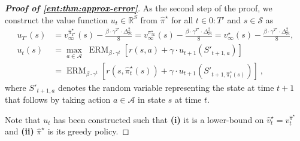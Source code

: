 \documentclass[twoside]{article}
\newcommand{\states}{\mathcal{S}}
\newcommand{\actions}{\mathcal{A}}
\newcommand{\opt}{^\star}
\newcommand{\vspan}{\Delta_{\mathfrak{R}}}
\newcommand{\erm}[2]{\operatorname{ERM}_{#1}\left[#2\right]}
\newcommand{\Real}{\mathbb{R}}
\theoremstyle{plain}
\theoremstyle{definition}
\theoremstyle{remark}
\begin{document}
\begin{proof}[\bf\em Proof of \cref{ent:thm:approx-error}]
As the second step of the proof, we construct the value function $u_t\in \Real^S$ from $\hat{\pi}\opt$ for all $t \in 0{:}T'$ and $s\in \states$ as
%
\begin{align}
\label{ent:eq:u-construction}
  u_{T'}(s) &= v_{\infty}^{\hat{\pi}^\star_{T'}}(s) -  \frac{\beta \cdot \gamma^{T'} \cdot \vspan^2}{8} = v_{\infty}^{\pi_{\infty}\opt}(s) - \frac{\beta \cdot \gamma^{T'} \cdot \vspan^2}{8} = v_{\infty}\opt(s) - \frac{\beta \cdot \gamma^{T'} \cdot \vspan^2}{8}, \nonumber \\
  u_t(s) &= \max_{a\in \actions} \; \erm{\beta \cdot \gamma^t} { r(s,a) + \gamma \cdot u_{t+1}(S'_{t+1,a}) } \\
  &= \erm{\beta \cdot \gamma^t} { r(s,\hat{\pi}^\star_t(s)) + \gamma \cdot u_{t+1}(S'_{t+1,\hat{\pi}^\star_t(s)}) } ~, \nonumber
\end{align}
%
where $S'_{t+1,a}$ denotes the random variable representing the state at time $t+1$ that follows by taking action $a\in\mathcal A$ in state $s$ at time $t$. 

Note that $u_t$ has been constructed such that {\bf (i)} it is a lower-bound on $\hat{v}^\star_t=v_t^{\hat{\pi}\opt}$ and {\bf (ii)} $\hat{\pi}\opt$ is its greedy policy. 


\end{proof}
\end{document}

